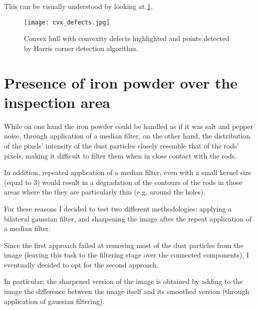         This can be visually understood by looking at \ref{fig:cvx_defects}.

        \vspace{5 mm}
        \begin{figure}[h]
            \centering
            \texttt{[image: cvx\_defects.jpg]}
            \caption{Convex hull with convexity defects highlighted and points detected by Harris corner detection algorithm.}
            \label{fig:cvx_defects}
        \end{figure}

    \section{Presence of iron powder over the inspection area}
        
        While on one hand the iron powder could be handled as if it was salt and pepper noise, through application of a median filter, on the other hand, the distribution of 
        the pixels' intensity of the dust particles closely resemble that of the rods' pixels, making it difficult to filter them when in close contact with the rods.

        In addition, repeated application of a median filter, even with a small kernel size (equal to $3$) would result in a degradation of the contours of the rods in those areas 
        where the they are particularly thin (e.g. around the holes).

        For these reasons I decided to test two different methodologies: applying a bilateral gaussian filter, and sharpening the image after the repeat application 
        of a median filter.

        Since the first approach failed at removing most of the dust particles from the image (leaving this task to the filtering stage over the connected components), I eventually 
        decided to opt for the second approach.

        In particular, the sharpened version of the image is obtained by adding to the image the difference between the image itself and its smoothed version (through application 
        of gaussian filtering).